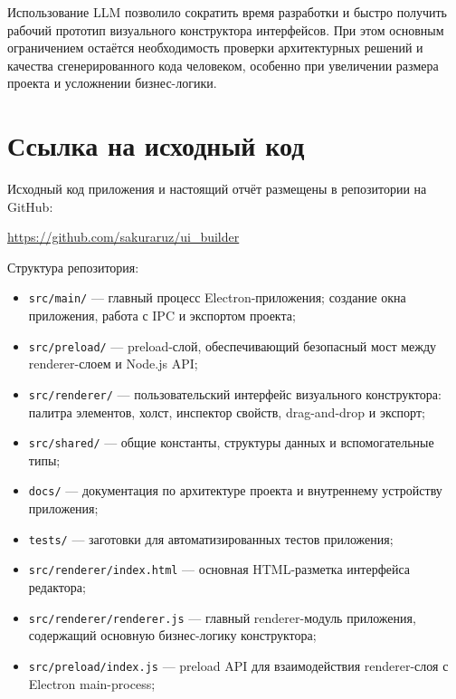 \documentclass[14pt,a4paper]{extarticle}
\begin{document}
{{Использование LLM позволило сократить время разработки и быстро получить рабочий прототип визуального конструктора интерфейсов. При этом основным ограничением остаётся необходимость проверки архитектурных решений и качества сгенерированного кода человеком, особенно при увеличении размера проекта и усложнении бизнес-логики.

\newpage
\section{Ссылка на исходный код}

Исходный код приложения и настоящий отчёт размещены в репозитории на GitHub:

\begin{center}
\url{https://github.com/sakuraruz/ui\_builder}
\end{center}

Структура репозитория:

\begin{itemize}
    \item \texttt{src/main/} --- главный процесс Electron-приложения; создание окна приложения, работа с IPC и экспортом проекта;

    \item \texttt{src/preload/} --- preload-слой, обеспечивающий безопасный мост между renderer-слоем и Node.js API;

    \item \texttt{src/renderer/} --- пользовательский интерфейс визуального конструктора: палитра элементов, холст, инспектор свойств, drag-and-drop и экспорт;

    \item \texttt{src/shared/} --- общие константы, структуры данных и вспомогательные типы;

    \item \texttt{docs/} --- документация по архитектуре проекта и внутреннему устройству приложения;

    \item \texttt{tests/} --- заготовки для автоматизированных тестов приложения;

    \item \texttt{src/renderer/index.html} --- основная HTML-разметка интерфейса редактора;

    \item \texttt{src/renderer/renderer.js} --- главный renderer-модуль приложения, содержащий основную бизнес-логику конструктора;

    \item \texttt{src/preload/index.js} --- preload API для взаимодействия renderer-слоя с Electron main-process;


\end{itemize}}}
\end{document}

